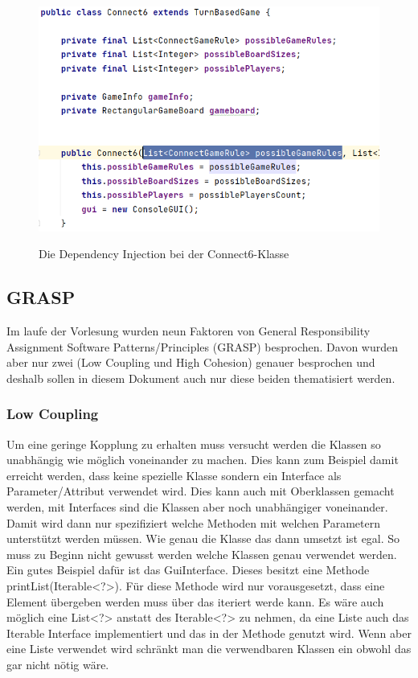 \documentclass[12pt]{article}
\begin{document}
\begin{figure}[H]
\centering
{\includegraphics[width=13cm]{Bilder/DependencyInjection}}
\caption{Die Dependency Injection bei der Connect6-Klasse}
\label{fig:DependencyInjection}
\end{figure}



\subsection{GRASP}
Im laufe der Vorlesung wurden neun Faktoren von General Responsibility Assignment Software Patterns/Principles (GRASP) besprochen. Davon wurden aber nur zwei (Low Coupling und High Cohesion) genauer besprochen und deshalb sollen in diesem Dokument auch nur diese beiden thematisiert werden.



\subsubsection{Low Coupling}
Um eine geringe Kopplung zu erhalten muss versucht werden die Klassen so unabhängig wie möglich voneinander zu machen. Dies kann zum Beispiel damit erreicht werden, dass keine spezielle Klasse sondern ein Interface als Parameter/Attribut verwendet wird. Dies kann auch mit Oberklassen gemacht werden, mit Interfaces sind die Klassen aber noch unabhängiger voneinander. Damit wird dann nur spezifiziert welche Methoden mit welchen Parametern unterstützt werden müssen. Wie genau die Klasse das dann umsetzt ist egal. So muss zu Beginn nicht gewusst werden welche Klassen genau verwendet werden. 
\\

Ein gutes Beispiel dafür ist das GuiInterface. Dieses besitzt eine Methode printList(Iterable<?>). Für diese Methode wird nur vorausgesetzt, dass eine Element übergeben werden muss über das iteriert werde kann. Es wäre auch möglich eine List<?> anstatt des Iterable<?> zu nehmen, da eine Liste auch das Iterable Interface implementiert und das in der Methode genutzt wird. Wenn aber eine Liste verwendet wird schränkt man die verwendbaren Klassen ein obwohl das gar nicht nötig wäre.
\\
\end{document}
